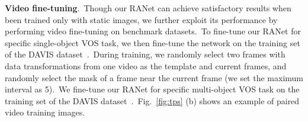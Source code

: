 \documentclass[10pt,twocolumn,letterpaper]{article}
\begin{document}
\noindent
\textbf{Video fine-tuning}.\
Though our RANet can achieve satisfactory results when been trained only with static images, we further exploit its performance by performing video fine-tuning on benchmark datasets.\ To fine-tune our RANet for specific single-object VOS task, we then fine-tune the network on the training set of the DAVIS dataset~\cite{davis2016}.\ During training, we randomly select two frames with data transformations from one video as the template and current frames, and randomly select the mask of a frame near the current frame (we set the maximum interval as 5).\ We fine-tune our RANet for specific multi-object VOS task on the training set of the DAVIS dataset~\cite{davis2017}.\ Fig.~\ref{fig:tps} (b) shows an example of paired video training images.
\end{document}
